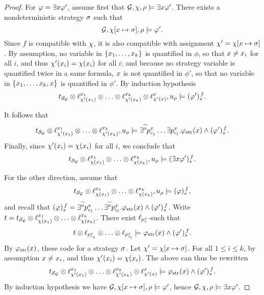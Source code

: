 \begin{proof}
\halfline
For $\phi=\exists\var\phi'$, assume first that
$\CGS,\assign,{\fplay}\models\exists\var\phi'$. There exists a
nondeterministic strategy $\strat$ such that
 \[\CGS,\assign[\var\mapsto \strat],\fplay\models \phi'.\] Since $f$ is
 compatible with $\assign$, it is also compatible with assignment
 $\assign'=\assign[\var\mapsto \strat]$. By assumption, no variable in
 $\{\var_1,\ldots,\var_k\}$ is quantified in $\phi$, so that $\var\neq
 \var_i$ for all $i$, and thus $\assign'(\var_i)=\assign(\var_i)$ for
 all $i$; and because no strategy variable is
 quantified twice in a same formula,
 $\var$ is not quantified in $\phi'$, so that no variable in
 $\{\var_1,\ldots,\var_k,\var\}$ is quantified in $\phi'$.
 By induction hypothesis 
   \[\unfold[\KS_{\CGS}]{\sstate_{\pos_\init}}\prodlab
   \stratlab[\assign'(\var_1)]{\var_1}\prodlab\ldots \prodlab
   \stratlab[\assign'(\var_k)]{\var_k}\prodlab   \stratlab[\assign'(\var)]{\var},\noeud_{\fplay}
   \modelst \tr[f]{\phi'}.\]

It follows that   \[\unfold[\KS_{\CGS}]{\sstate_{\pos_\init}}\prodlab
  \stratlab[\assign'(\var_1)]{\var_1}\prodlab\ldots \prodlab
   \stratlab[\assign'(\var_k)]{\var_k},\noeud_{\fplay}
   \modelst \exists^{\trobs{\obs}} p_{\mov_{1}}^{\var}\ldots
   \exists   p_{\mov_{\maxmov}}^{\var}. \phistrat\et\tr[f]{\phi'}.\]
 Finally, since $\assign'(\var_i)=\assign(\var_i)$ for all $i$, we
 conclude that 
 \[\unfold[\KS_{\CGS}]{\sstate_{\pos_\init}}\prodlab
   \stratlab[\assign(\var_1)]{\var_1}\prodlab\ldots \prodlab
   \stratlab[\assign(\var_k)]{\var_k},\noeud_{\fplay}
   \modelst \tr[f]{\exists\var\phi'}.\]

For the other direction, assume
that
\[\unfold[\KS_{\CGS}]{\sstate_{\pos_\init}}\prodlab
  \stratlab[\assign(\var_1)]{\var_1}\prodlab\ldots \prodlab
  \stratlab[\assign(\var_k)]{\var_k},\noeud_{\fplay} \modelst
  \tr[f]{\phi},\] and recall that
$\tr[f]{\phi}=\exists^{\trobs{\obs}} p_{\mov_{1}}^{\var}\ldots
\exists^{\trobs{\obs}}
p_{\mov_{\maxmov}}^{\var}. \phistrat\et\tr[f]{\phi'}$.  Write
$\ltree=\unfold[\KS_{\CGS}]{\sstate_{\pos_\init}}\prodlab
\stratlab[\assign(\var_1)]{\var_1}\prodlab\ldots \prodlab
\stratlab[\assign(\var_k)]{\var_k}$. There exist
 $\plab[{p_\act^\var}]$- such that
\[\ltree\prodlab  \plab[{p_{\act_1}^\var}]\prodlab\ldots\prodlab \plab[{p_{\act_\maxmov}^\var}]
  \modelst \phistrat\et\tr[f]{\phi'}.\]
By $\phistrat$, these   
 code for a strategy $\strat$. Let
 $\assign'=\assign[\var\mapsto \strat]$. For all $1\leq i\leq k$, by
 assumption $\var\neq \var_i$, and thus $\assign'(\var_i)=\assign(\var_i)$.
 The above can thus be rewritten
 \[\unfold[\KS_{\CGS}]{\sstate_{\pos_\init}}\prodlab
\stratlab[\assign'(\var_1)]{\var_1}\prodlab\ldots \prodlab
\stratlab[\assign'(\var_k)]{\var_k}\prodlab  \stratlab[\assign'(\var)]{\var}
  \modelst \phistrat\et\tr[f]{\phi'}.\]
 By induction hypothesis we have
$\CGS,\assign[\var\mapsto
\strat],\fplay\models \phi'$, hence $\CGS,\assign,\fplay\models
\exists\var\phi'$.



\end{proof}
